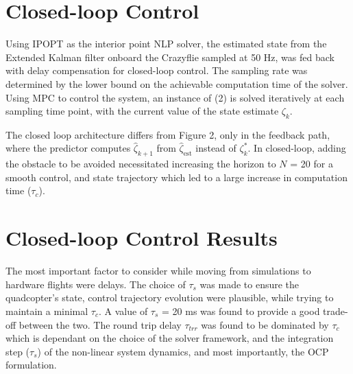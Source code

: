 \documentclass[conference]{IEEEtran}
\begin{document}

\section{Closed-loop Control }\label{Section5}
Using IPOPT \cite{wachter_implementation_2006} as the interior point NLP solver, the estimated state from the Extended Kalman filter onboard the Crazyflie sampled at 50 Hz, was fed back with delay compensation for closed-loop control. The sampling rate was determined by the lower bound on the achievable computation time of the solver. Using MPC to control the system, an instance of (2) is solved iteratively at each sampling time point, with the current value of the state estimate $\zeta_k$.

The closed loop architecture differs from Figure 2, only in the feedback path, where the predictor computes $\hat{\zeta}_{k+1}$ from $\hat{\zeta}_{\mathrm{est}}$ instead of $\zeta^*_{k}$.
In closed-loop, adding the obstacle to be avoided necessitated increasing the horizon to $N$ = 20 for a smooth control, and state trajectory which led to a large increase in computation time ($\tau_c$).

\section{Closed-loop Control Results}\label{Section6}

The most important factor to consider while moving from simulations to hardware flights were delays. The choice of
$\tau_s$ was made to ensure the quadcopter's state, control trajectory evolution were plausible, while trying to maintain a minimal $\tau_c$. A value of $\tau_s$ = 20 ms was found to provide a good trade-off between the two.
The round trip delay $\tau_{trr}$ was found to be dominated by $\tau_{c}$ which is dependant on the choice of the solver framework, and the integration step ($\tau_s$) of the non-linear system dynamics, and most importantly, the OCP formulation.

\end{document}

